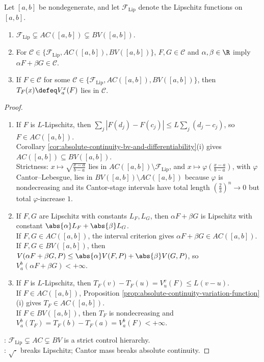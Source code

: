 \begin{proposition} \label{prop:lipschitz-ac-bv-strict-inclusions} \\
Let $[a,b]$ be nondegenerate, and let $\mathcal{F}_{\operatorname{Lip}}$ denote the Lipschitz functions on $[a,b]$.
\begin{enumerate}[label=(\roman*)]
\setlength{\itemsep}{0pt}
\item $\mathcal{F}_{\operatorname{Lip}}\subsetneq AC([a,b])\subsetneq BV([a,b])$.
\item For $\mathcal{C}\in\{\mathcal{F}_{\operatorname{Lip}},AC([a,b]),BV([a,b])\}$, $F,G\in\mathcal{C}$ and $\alpha,\beta\in\R$ imply $\alpha F+\beta G\in\mathcal{C}$.
\item If $F\in\mathcal{C}$ for some $\mathcal{C}\in\{\mathcal{F}_{\operatorname{Lip}},AC([a,b]),BV([a,b])\}$, then $T_F(x)\defeq V_a^x(F)$ lies in $\mathcal{C}$.
\end{enumerate}
\begin{proof}
\begin{enumerate}[label=(\roman*)]
\setlength{\itemsep}{0pt}
\item If $F$ is $L$-Lipschitz, then $\sum\limits_j|F(d_j)-F(c_j)|\leq L\sum\limits_j(d_j-c_j)$, so $F\in AC([a,b])$.\\
Corollary \ref{cor:absolute-continuity-bv-and-differentiability}(i) gives $AC([a,b])\subseteq BV([a,b])$.\\
Strictness: $x\mapsto\sqrt{\frac{x-a}{b-a}}$ lies in $AC([a,b])\setminus\mathcal{F}_{\operatorname{Lip}}$, and $x\mapsto\varphi(\frac{x-a}{b-a})$, with $\varphi$ Cantor--Lebesgue, lies in $BV([a,b])\setminus AC([a,b])$ because $\varphi$ is nondecreasing and its Cantor-stage intervals have total length $(\frac{2}{3})^n\to0$ but total $\varphi$-increase $1$.
\item If $F,G$ are Lipschitz with constants $L_F,L_G$, then $\alpha F+\beta G$ is Lipschitz with constant $\abs{\alpha}L_F+\abs{\beta}L_G$.\\
If $F,G\in AC([a,b])$, the interval criterion gives $\alpha F+\beta G\in AC([a,b])$.\\
If $F,G\in BV([a,b])$, then $V(\alpha F+\beta G,P)\leq\abs{\alpha}V(F,P)+\abs{\beta}V(G,P)$, so $V_a^b(\alpha F+\beta G)<+\infty$.
\item If $F$ is $L$-Lipschitz, then $T_F(v)-T_F(u)=V_u^v(F)\leq L(v-u)$.\\
If $F\in AC([a,b])$, Proposition \ref{prop:absolute-continuity-variation-function}(i) gives $T_F\in AC([a,b])$.\\
If $F\in BV([a,b])$, then $T_F$ is nondecreasing and $V_a^b(T_F)=T_F(b)-T_F(a)=V_a^b(F)<+\infty$.
\end{enumerate}
: $\mathcal{F}_{\operatorname{Lip}}\subsetneq AC\subsetneq BV$ is a strict control hierarchy.\\
: $\sqrt{\cdot}$ breaks Lipschitz; Cantor mass breaks absolute continuity.
\end{proof}
\end{proposition}

